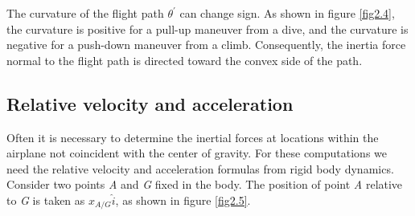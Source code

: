\documentclass{AeroStructure-ERJohnson}
\begin{document}
{\def\thefigure{2.3}
}





The curvature of the flight path $\theta^{\prime}$ can change sign. As shown in figure \ref{fig2.4}, the curvature is positive for a pull-up maneuver from a dive, and the curvature is negative for a push-down maneuver from a climb. Consequently, the inertia force normal to the flight path is directed toward the convex side of the path.

{\def\thefigure{2.4}
}


\subsection{Relative velocity and acceleration}\label{sec2.2.3}

Often it is necessary to determine the inertial forces at locations within the airplane not coincident with the center of gravity. For these computations we need the relative velocity and acceleration formulas from rigid body dynamics. Consider two points \textit{A} and \textit{G} fixed in the body. The position of point \textit{A} relative to \textit{G} is taken as $x_{A/G} \hat{i}$, as shown in figure \ref{fig2.5}.
\end{document}
